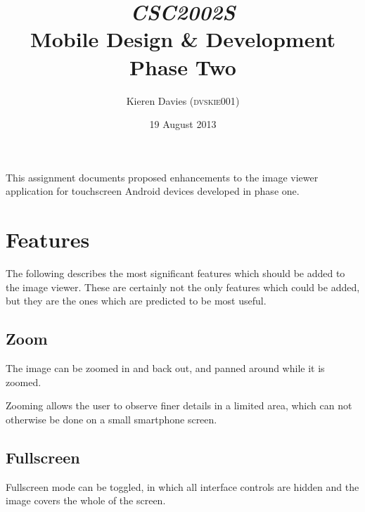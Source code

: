 \documentclass[a4paper,11pt]{article}
\begin{document}
\title{\emph{CSC2002S} \\
       Mobile Design \& Development \\
       Phase Two}
\author{Kieren Davies (\textsc{dvskie001})}
\date{19 August 2013}
\maketitle

This assignment documents proposed enhancements to the image viewer application for touchscreen Android devices developed in phase one.

\section{Features}  %

The following describes the most significant features which should be added to the image viewer.  These are certainly not the only features which could be added, but they are the ones which are predicted to be most useful.

%
%
%

\subsection{Zoom}

The image can be zoomed in and back out, and panned around while it is zoomed.

Zooming allows the user to observe finer details in a limited area, which can not otherwise be done on a small smartphone screen.

\subsection{Fullscreen}

Fullscreen mode can be toggled, in which all interface controls are hidden and the image covers the whole of the screen.
\end{document}

